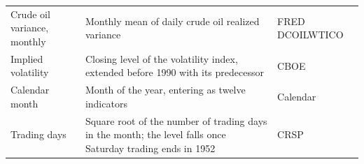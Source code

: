 {\begin{longtable}{>{\raggedright\arraybackslash}m{3.3cm}>{\raggedright\arraybackslash}m{6.2cm}>{\raggedright\arraybackslash}m{2.9cm}}
Crude oil variance, monthly & Monthly mean of daily crude oil realized variance & FRED DCOILWTICO \\
Implied volatility & Closing level of the volatility index, extended before 1990 with its predecessor & CBOE \\
Calendar month & Month of the year, entering as twelve indicators & Calendar \\
Trading days & Square root of the number of trading days in the month; the level falls once Saturday trading ends in 1952 & CRSP \\
\end{longtable}
}
